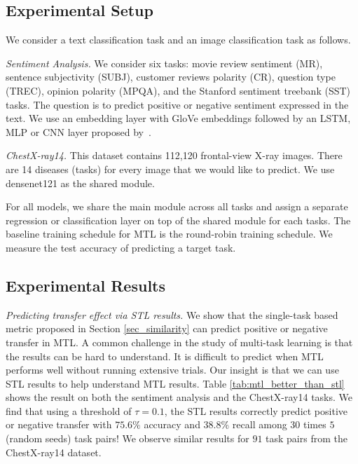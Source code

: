 \vspace{-0.07in}
\subsection{Experimental Setup}

We consider a text classification task and an image classification task as follows.

{\it Sentiment Analysis.} We consider six tasks: movie review sentiment (MR), sentence subjectivity (SUBJ), customer reviews polarity (CR), question type (TREC), opinion polarity (MPQA), and the Stanford sentiment treebank (SST) tasks.
The question is to predict positive or negative sentiment expressed in the text.
We use an embedding layer with GloVe embeddings
followed by an LSTM, MLP or CNN layer proposed by~\cite{lei2018simple}.


{\it ChestX-ray14.} This dataset contains 112,120 frontal-view X-ray images.
There are 14 diseases (tasks) for every image that we would like to predict.
We use densenet121 as the shared module.


For all models, we share the main module across all tasks and assign a separate regression or classification layer on top of the shared module for each tasks.
The baseline training schedule for MTL is the round-robin training schedule.
We measure the test accuracy of predicting a target task.

\vspace{-0.07in}
\subsection{Experimental Results}

\textit{Predicting transfer effect via STL results.}
We show that the single-task based metric proposed in Section \ref{sec_similarity} can predict positive or negative transfer in MTL.
A common challenge in the study of multi-task learning is that the results can be hard to understand.
It is difficult to predict when MTL performs well without running extensive trials.
Our insight is that we can use STL results to help understand MTL results.
Table \ref{tab:mtl_better_than_stl} shows the result on both the sentiment analysis and the ChestX-ray14 tasks.
We find that using a threshold of $\tau = 0.1$, the STL results correctly predict positive or negative transfer with $75.6\%$ accuracy and $38.8\%$ recall among $30$ times $5$ (random seeds) task pairs!
We observe similar results for $91$ task pairs from the ChestX-ray14 dataset.

